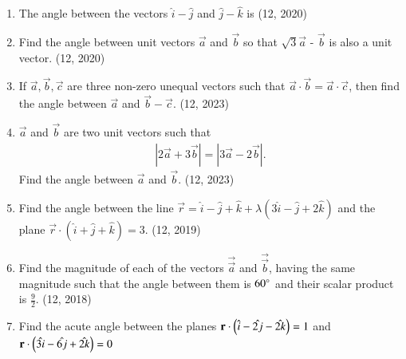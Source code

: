 \begin{enumerate}[label=\thesubsection.\arabic*, ref=\thesubsection.\theenumi]
\item The angle between the vectors $\hat{i} - \hat{j}$ and $\hat{j} - \hat{k}$ is
\hfill (12, 2020)
\item Find the angle between unit vectors $\overrightarrow{a}$ and $\overrightarrow{b}$ so that $\sqrt{3}\overrightarrow{a}$ - $\overrightarrow{b}$ is also a unit vector.
\hfill (12, 2020)
    \item If $\overrightarrow{a}, \overrightarrow{b}, \overrightarrow{c}$ are three non-zero unequal vectors such that $\overrightarrow{a} \cdot \overrightarrow{b} = \overrightarrow{a} \cdot \overrightarrow{c}$, then find the angle between $\overrightarrow{a}$ and $\overrightarrow{b} - \overrightarrow{c}$.
    \hfill (12, 2023)
    \item $\overrightarrow{a}$ and $\overrightarrow{b}$ are two unit vectors such that
    \begin{align}
        \left| 2\overrightarrow{a} + 3\overrightarrow{b} \right| = \left| 3\overrightarrow{a} - 2\overrightarrow{b} \right|.
    \end{align}
  Find the angle between $\overrightarrow{a}$ and $\overrightarrow{b}$.
    \hfill (12, 2023)
	\item Find the angle between the line $\overrightarrow{r} = \hat{i} - \hat{j} + \hat{k} + \lambda (3\hat{i} - \hat{j} + 2\hat{k})$ and the plane $\overrightarrow{r} \cdot (\hat{i} + \hat{j} + \hat{k}) = 3$. \hfill (12, 2019)
\item Find the magnitude of each of the vectors $\overrightarrow{\vec{a}}$ and $\overrightarrow{\vec{b}}$, having the same magnitude such that the angle between them is $60\degree$ and their scalar product is $\frac{9}{2}$. \hfill (12, 2018)
\item Find the acute angle between the planes $\mathbf{r}\cdot\left( \hat{i}-\hat{2j}-\hat{2k}\right)=1$ and $\mathbf{r}\cdot \left(\hat{3i}-\hat{6j}+\hat{2k}\right)=0$


\end{enumerate}
